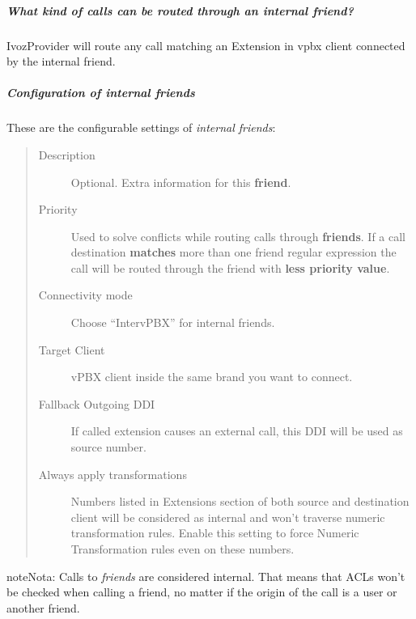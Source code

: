 \documentclass[letterpaper,10pt,spanish]{sphinxmanual}
\begin{document}
\subparagraph{What kind of calls can be routed through an \emph{internal friend}?}
\label{administration_portal/client/vpbx/routing_endpoints/friends/internal_friends:what-kind-of-calls-can-be-routed-through-an-internal-friend}
IvozProvider will route any call matching an Extension in vpbx client connected by the internal friend.


\subparagraph{Configuration of internal friends}
\label{administration_portal/client/vpbx/routing_endpoints/friends/internal_friends:configuration-of-internal-friends}
These are the configurable settings of \emph{internal friends}:
\begin{quote}
\begin{description}
\item[{Description}] \leavevmode
Optional. Extra information for this \textbf{friend}.

\item[{Priority}] \leavevmode
Used to solve conflicts while routing calls through \textbf{friends}.
If a call destination \textbf{matches} more than one friend regular expression
the call will be routed through the friend with \textbf{less priority value}.

\item[{Connectivity mode}] \leavevmode
Choose ``IntervPBX'' for internal friends.

\item[{Target Client}] \leavevmode
vPBX client inside the same brand you want to connect.

\item[{Fallback Outgoing DDI}] \leavevmode
If called extension causes an external call, this DDI will be used as source number.

\item[{Always apply transformations}] \leavevmode
Numbers listed in Extensions section of both source and destination client will be considered as internal and
won't traverse numeric transformation rules. Enable this setting to force Numeric Transformation rules even on these numbers.

\end{description}
\end{quote}

\begin{notice}{note}{Nota:}
Calls to \emph{friends} are considered internal. That means that ACLs won't
be checked when calling a friend, no matter if the origin of the call
is a user or another friend.
\end{notice}
\end{document}
